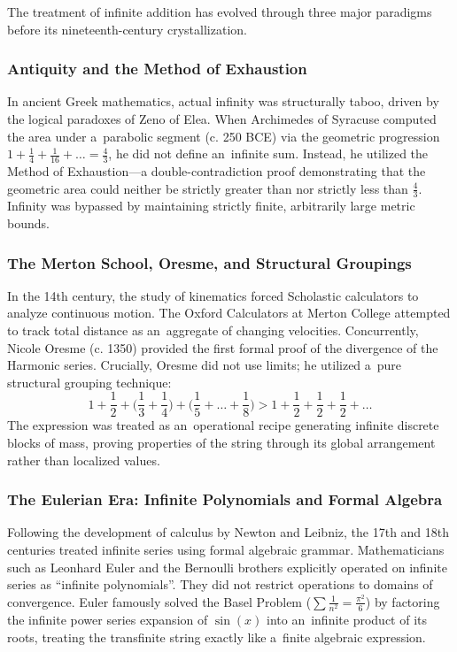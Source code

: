 \documentclass[11pt,a4paper]{article}
\newcommand\noex{\hspace{-1ex}} %
\newcommand\thex{\hspace{.1ex}} %
\theoremstyle{definition}
\theoremstyle{noperiod}
\begin{document}
The treatment of infinite addition has evolved through three major paradigms before its nineteenth-century crystallization.

\subsubsection{Antiquity and the Method of Exhaustion}

In ancient Greek mathematics, actual infinity was structurally taboo, driven by the logical paradoxes of Zeno of Elea. When Archimedes of Syracuse computed the area under a~parabolic segment (c. 250 BCE) via the geometric progression $1 + \frac{1}{4} + \frac{1}{16} + \dots = \frac{4}{3}$, he did not define an~infinite sum. Instead, he utilized the Method of Exhaustion—a double-contradiction proof demonstrating that the geometric area could neither be strictly greater than nor strictly less than $\frac{4}{3}$. Infinity was bypassed by maintaining strictly finite, arbitrarily large metric bounds.

\subsubsection{The Merton School, Oresme, and Structural Groupings}

In the 14th century, the study of kinematics forced Scholastic calculators to analyze continuous motion. The Oxford Calculators at Merton College attempted to track total distance as an~aggregate of changing velocities. Concurrently, Nicole Oresme (c. 1350) provided the first formal proof of the divergence of the Harmonic series. Crucially, Oresme did not use limits; he utilized a~pure structural grouping technique:
\begin{equation}
1 + \frac{1}{2} + \biggl(\frac{1}{3} + \frac{1}{4}\biggr) + \biggl(\frac{1}{5} + \dots + \frac{1}{8}\biggr) > 1 + \frac{1}{2} + \frac{1}{2} + \frac{1}{2} + \dots
\end{equation}
The expression was treated as an~operational recipe generating infinite discrete blocks of mass, proving properties of the string through its global arrangement rather than localized values.

\subsubsection{The Eulerian Era: Infinite Polynomials and Formal Algebra}

Following the development of calculus by Newton and Leibniz, the 17th and 18th centuries treated infinite series using formal algebraic grammar. Mathematicians such as Leonhard Euler and the Bernoulli brothers explicitly operated on infinite series as ``infinite polynomials''\noex\thex. They did not restrict operations to domains of convergence. Euler famously solved the Basel Problem ($\sum \frac{1}{n^2} = \frac{\pi^2}{6}$) by factoring the infinite power series expansion of $\sin(x)$ into an~infinite product of its roots, treating the transfinite string exactly like a~finite algebraic expression.
\end{document}
